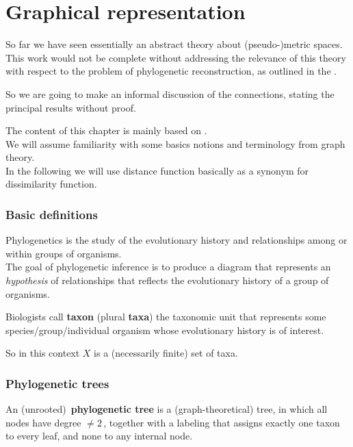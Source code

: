 \documentclass[./main.tex]{subfiles}
\begin{document}
\ifSubfilesClassLoaded{\mainmatter}{}

\chapter{Graphical representation} \label{chap:p3c1}

So far we have seen essentially an abstract theory about (pseudo-)metric spaces. This work would not be complete without addressing the relevance of this theory with respect to the problem of phylogenetic reconstruction, as outlined in the .

So we are going to make an informal discussion of the connections, stating the principal results without proof.

The content of this chapter is mainly based on \cite{HRS11}. \\
We will assume familiarity with some basics notions and terminology from graph theory. \\
In the following we will use distance function basically as a synonym for dissimilarity function.\bigskip


\subsection*{Basic definitions}

Phylogenetics is the study of the evolutionary history and relationships among or within groups of organisms. \\
The goal of phylogenetic inference is to produce a diagram that represents an \emph{hypothesis} of relationships that reflects the evolutionary history of a group of organisms.

Biologists call \textbf{taxon} (plural \textbf{taxa}) the taxonomic unit that represents some species/group/individual organism whose evolutionary history is of interest.

So in this context $X$ is a (necessarily finite) set of taxa.\bigskip


\subsection*{Phylogenetic trees}

An (unrooted)\footnotemark\ \textbf{phylogenetic tree} is a (graph-theoretical) tree, in which all nodes have degree $\neq 2 \,$, together with a labeling that assigns exactly one taxon to every leaf, and none to any internal node.
\end{document}
